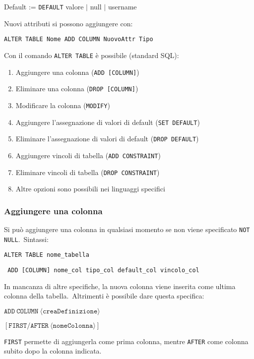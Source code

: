 \begin{flushleft}
	Default := \texttt{DEFAULT} {valore $|$ null $|$ username}
\end{flushleft}

\noindent  Nuovi attributi si possono aggiungere con:
\begin{flushleft}
	\texttt{ALTER TABLE Nome ADD COLUMN NuovoAttr Tipo}
\end{flushleft}

\noindent Con il comando \texttt{ALTER TABLE} è possibile (standard SQL):
\begin{enumerate}
	\item Aggiungere una colonna (\texttt{ADD [COLUMN]})
	\item Eliminare una colonna (\texttt{DROP [COLUMN]})
	\item Modificare la colonna (\texttt{MODIFY})
	\item Aggiungere l'assegnazione di valori di default (\texttt{SET DEFAULT})
	\item Eliminare l'assegnazione di valori di default (\texttt{DROP DEFAULT})
	\item Aggiungere vincoli di tabella (\texttt{ADD CONSTRAINT})
	\item Eliminare vincoli di tabella (\texttt{DROP CONSTRAINT})
	\item Altre opzioni sono possibili nei linguaggi specifici
\end{enumerate}

\subsubsection{Aggiungere una colonna}
Si può aggiungere una colonna in qualsiasi momento se non
viene specificato \texttt{NOT NULL}.\
Sintassi:
\begin{flushleft}
	\texttt{ALTER TABLE nome\_tabella}

	\texttt{ ADD [COLUMN] nome\_col tipo\_col default\_col vincolo\_col}
\end{flushleft}

\noindent In mancanza di altre specifiche, la nuova colonna viene inserita come ultima colonna della tabella.\
Altrimenti è possibile dare questa specifica:
\begin{flushleft}
	$\mathtt{ADD\ COLUMN\ \langle creaDefinizione\rangle}$

	\quad $\mathtt{[FIRST/AFTER\ \langle nomeColonna \rangle]}$
\end{flushleft}

\noindent \texttt{FIRST} permette di aggiungerla come prima colonna, mentre \texttt{AFTER} come colonna
subito dopo la colonna indicata.\

